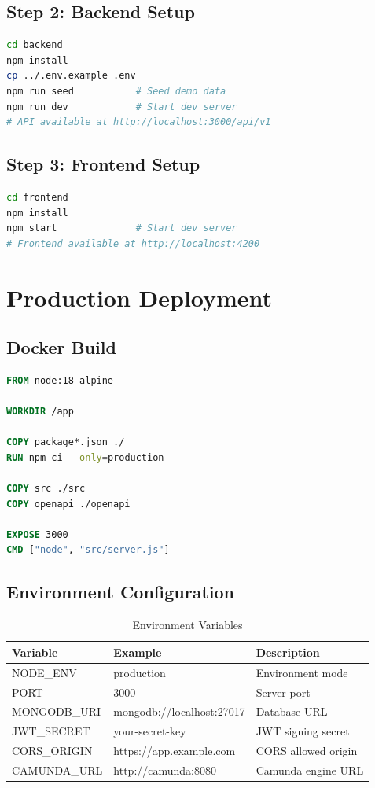 \documentclass[11pt,a4paper,oneside,openany]{book}
\begin{document}
\subsection{Step 2: Backend Setup}

\begin{lstlisting}[language=bash,caption=Backend Installation]
cd backend
npm install
cp ../.env.example .env
npm run seed           # Seed demo data
npm run dev            # Start dev server
# API available at http://localhost:3000/api/v1
\end{lstlisting}

\subsection{Step 3: Frontend Setup}

\begin{lstlisting}[language=bash,caption=Frontend Installation]
cd frontend
npm install
npm start              # Start dev server
# Frontend available at http://localhost:4200
\end{lstlisting}

\section{Production Deployment}

\subsection{Docker Build}

\begin{lstlisting}[language=dockerfile,caption=Backend Dockerfile]
FROM node:18-alpine

WORKDIR /app

COPY package*.json ./
RUN npm ci --only=production

COPY src ./src
COPY openapi ./openapi

EXPOSE 3000
CMD ["node", "src/server.js"]
\end{lstlisting}

\subsection{Environment Configuration}

\begin{table}[H]
\centering
\small
\begin{tabular}{|l|l|p{4cm}|}
\hline
\textbf{Variable} & \textbf{Example} & \textbf{Description} \\
\hline
NODE\_ENV & production & Environment mode \\
PORT & 3000 & Server port \\
MONGODB\_URI & mongodb://localhost:27017 & Database URL \\
JWT\_SECRET & your-secret-key & JWT signing secret \\
CORS\_ORIGIN & https://app.example.com & CORS allowed origin \\
CAMUNDA\_URL & http://camunda:8080 & Camunda engine URL \\
\hline
\end{tabular}
\caption{Environment Variables}
\end{table}
\end{document}
